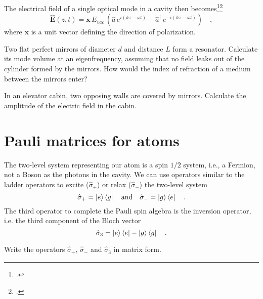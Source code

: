 The electrical field of a single optical mode in a cavity then becomes\footcite[chap. 2.1 and 2.4]{GerryKnight2005}\footcite[chap. 6.1]{Rand2016}
\begin{equation}
\hat{\boldsymbol{E}}(z,t) = \boldsymbol{x} \, E_{vac} \, \left(\hat{a} \, e^{i (k z - \omega t)} + \hat{a}^\dagger   \, e^{-i (k z - \omega t)} \right) 
\quad ,
\end{equation}
where $\boldsymbol{x}$ is a unit vector defining the direction of polarization. 


\begin{questions}
\item Two flat perfect mirrors of diameter $d$ and distance $L$  form a resonator. Calculate its mode volume at an eigenfrequency, assuming that no field leaks out of the cylinder formed by the mirrors. How would the index of refraction of  a medium between the mirrors enter?

\item In an elevator cabin, two opposing walls  are covered by mirrors. Calculate the amplitude of the electric field in the cabin. 
\end{questions}



\section{Pauli matrices for atoms}

The two-level system representing our atom is a spin $1/2$ system, i.e., a Fermion, not a Boson as the photons in the cavity. We can use operators similar to the ladder operators to excite ($  \hat{\sigma}_+$) or relax ($  \hat{\sigma}_-$) the two-level system
\begin{equation}
 \hat{\sigma}_+ = \ket{e} \bra{g} \quad \text{and} \quad 
  \hat{\sigma}_- = \ket{g} \bra{e} \quad .
\end{equation}
The third operator to complete the Pauli spin algebra is the inversion operator, i.e. the third component of the Bloch vector
\begin{equation}
 \hat{\sigma}_3 = \ket{e} \bra{e} - \ket{g} \bra{g} \quad .
\end{equation} 

\begin{questions}
\item Write the operators  $  \hat{\sigma}_+$, $  \hat{\sigma}_-$ and 
$ \hat{\sigma}_3 $ in matrix form.
\end{questions}



